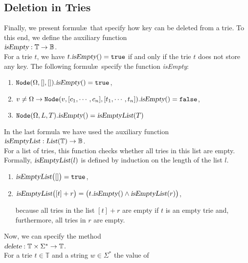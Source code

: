 \subsection{Deletion in Tries}
Finally, we present formul\ae\ that specify how key can be deleted from a trie.
To this end, we define the auxiliary function
\\[0.2cm]
\hspace*{1.3cm} 
$\textsl{isEmpty}: \mathbb{T} \rightarrow \mathbb{B}$.
\\[0.2cm]
For a trie $t$, we have $t.\textsl{isEmpty}() = \mathtt{true}$ if and only if the trie $t$ does not
store any key.  The following formul\ae\ specify the function \textsl{isEmpty}:
\begin{enumerate}
\item $\texttt{Node}(\Omega, [],[]).\textsl{isEmpty}() = \mathtt{true}$,
\item $v \not= \Omega \rightarrow 
       \texttt{Node}(v, [c_1,\cdots,c_n],[t_1,\cdots,t_n]).\textsl{isEmpty}() = \mathtt{false}$,
\item $\texttt{Node}(\Omega, L, T).\textsl{isEmpty}() = \textsl{isEmptyList}(T)$
\end{enumerate}
In the last formula we have used the auxiliary function
\\[0.2cm]
\hspace*{1.3cm}
$\textsl{isEmptyList}: \textsl{List}(\mathbb{T}) \rightarrow \mathbb{B}$.
\\[0.2cm]
For a list of tries, this function checks whether all tries in this list are empty.  Formally,
$\textsl{isEmptyList}(l)$ is defined by induction on the length of the list $l$.
\begin{enumerate}
\item $\textsl{isEmptyList}\bigl([]\bigr) = \mathtt{true}$,
\item $\textsl{isEmptyList}\bigl([t] + r\bigr) = \bigl(t.\textsl{isEmpty}() \wedge \textsl{isEmptyList}(r)\bigr)$,

      because all  tries in the list $[t]+r$ are empty if  $t$ is an empty trie
      and, furthermore, all tries in  $r$ are empty.
\end{enumerate}
Now, we can specify the method
\\[0.2cm]
\hspace*{1.3cm}
$\textsl{delete}: \mathbb{T} \times \Sigma^* \rightarrow \mathbb{T}$.
\\[0.2cm]
For a trie  $t \in \mathbb{T}$ and a string $w \in \Sigma^*$ the value of
 \\[0.2cm]
